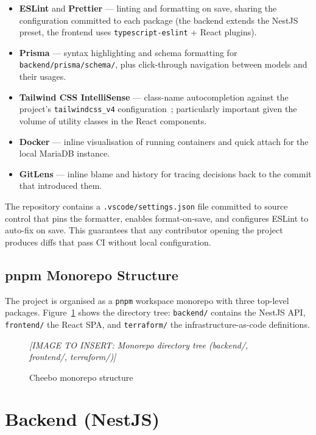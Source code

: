 \documentclass[12pt, a4paper, oneside]{report}
\newcommand{\imagePlaceholder}[2][8cm]{%
  \begin{mdframed}[backgroundcolor=cheebolightgray,linecolor=gray!40]
    \centering
    \vspace{#1}
    \textit{\color{gray}[IMAGE TO INSERT: #2]}
    \vspace{8mm}
  \end{mdframed}
}
\begin{document}
\begin{itemize}[leftmargin=*,itemsep=2pt]
  \item \textbf{ESLint} and \textbf{Prettier} --- linting and
        formatting on save, sharing the configuration committed to
        each package (the backend extends the NestJS preset, the
        frontend uses \texttt{typescript-eslint} + React plugins).
  \item \textbf{Prisma} --- syntax highlighting and schema
        formatting for \texttt{backend/prisma/schema/}, plus
        click-through navigation between models and their usages.
  \item \textbf{Tailwind CSS IntelliSense} --- class-name
        autocompletion against the project's
        \texttt{tailwindcss\_v4} configuration~\cite{tailwind}; particularly
        important given the volume of utility classes in the React
        components.
  \item \textbf{Docker} --- inline visualisation of running
        containers and quick attach for the local MariaDB instance.
  \item \textbf{GitLens} --- inline blame and history for tracing
        decisions back to the commit that introduced them.
\end{itemize}

The repository contains a \texttt{.vscode/settings.json} file
committed to source control that pins the formatter, enables
format-on-save, and configures ESLint to auto-fix on save. This
guarantees that any contributor opening the project produces
diffs that pass CI without local configuration.

\subsection{pnpm Monorepo Structure}

The project is organised as a \texttt{pnpm} workspace monorepo with
three top-level packages. Figure~\ref{fig:monorepo} shows the
directory tree: \texttt{backend/} contains the NestJS API,
\texttt{frontend/} the React SPA, and \texttt{terraform/} the
infrastructure-as-code definitions.

\begin{figure}[H]
  \centering
  \imagePlaceholder[6cm]{Monorepo directory tree (backend/, frontend/, terraform/)}
  \caption{Cheebo monorepo structure}
  \label{fig:monorepo}
\end{figure}

\section{Backend (NestJS)}
\end{document}
